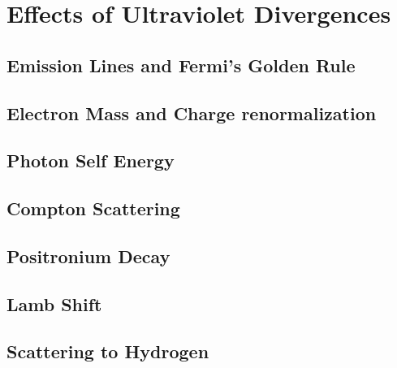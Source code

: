 \chapter{Effects of Ultraviolet Divergences}

\section{Emission Lines and Fermi's Golden Rule}
\label{sec:second-quantization}


\section{Electron Mass and Charge renormalization}
\section{Photon Self Energy}
\section{Compton Scattering}
\section{Positronium Decay}
\section{Lamb Shift}
\section{Scattering to Hydrogen}